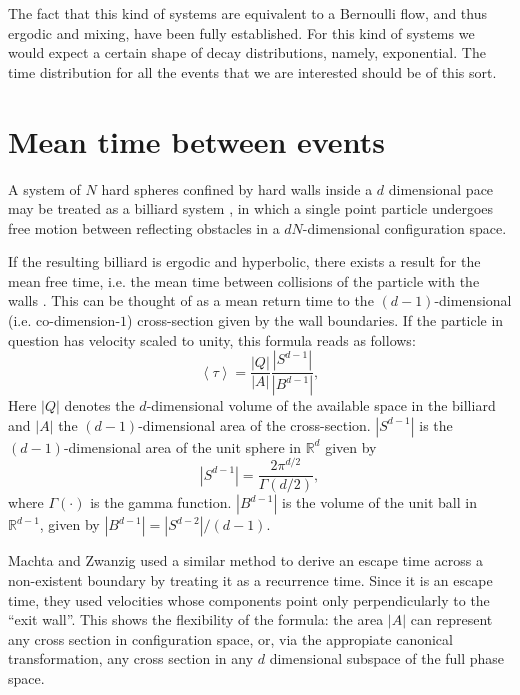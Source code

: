 \documentclass[letterpaper,12pt]{amsart}
\newcommand{\mean}[1]{\left \langle #1 \right \rangle}
\newcommand{\RR}{\mathbb{R}}
\begin{document}
The fact that this kind of systems are equivalent to a Bernoulli flow,
and thus ergodic and mixing, have been fully established. For this kind
of systems we would expect a certain shape of decay distributions, namely, 
exponential. The time distribution for all the events that we are
interested should be of this sort.  


\section{Mean time between events}

A system of $N$ hard spheres confined by hard walls inside a $d$ dimensional
pace may be treated as a billiard system \cite{Sinai70, MarkChern}, 
in which a single point  
particle undergoes free motion between reflecting obstacles 
in a $ d N $-dimensional configuration space. 

If the resulting billiard is ergodic and hyperbolic, 
there exists 
a result for the mean free time, i.e. the mean time between 
collisions of the particle with the walls \cite{MarkChern}. 
This can be thought of as a mean return time to the $(d-1)$-dimensional 
(i.e. co-dimension-$1$) cross-section given by the wall boundaries.
If the particle in question has velocity scaled
to unity, this formula reads as follows:
\begin{equation}
 \mean{\tau} = \frac{|Q|}{|A|} \frac{|S^{d-1}|}{|B^{d-1}|},
\end{equation}
Here $|Q|$ denotes the $d$-dimensional volume of the available space in the 
billiard and 
$|A|$ the $(d-1)$-dimensional area of the cross-section.
 $|S^{d-1}|$ is the $(d-1)$-dimensional area of the unit sphere in $\RR^d$ given by
\begin{equation}
  |S^{d-1}| = \frac{2 \pi^{d/2}}{\Gamma(d/2)},
\end{equation}
where $\Gamma(\cdot)$ is the gamma function. 
$|B^{d-1}|$ is the volume of the unit ball 
in $\RR^{d-1}$, given by $|B^{d-1}| = |S^{d-2}| / (d-1)$.

Machta and Zwanzig \cite{MachtaZwan} used a similar method to derive an escape 
time across a non-existent boundary by treating it as a recurrence time.
Since it is an escape time, they used velocities whose components point only 
perpendicularly to the ``exit wall''. This
shows the flexibility of the formula: the area  $|A|$ can represent
any cross section in configuration space,
or, via the appropiate canonical transformation, any
cross section in any $d$ dimensional subspace
of the full phase space.
 
\end{document}

